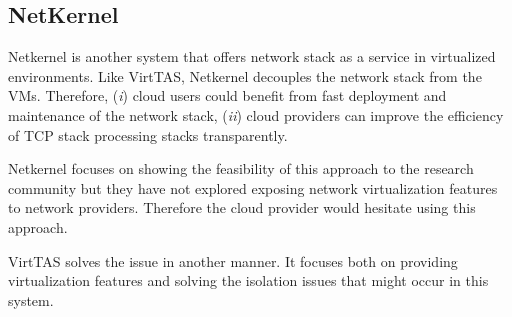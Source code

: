 \subsection{NetKernel}
Netkernel is another system that offers network stack as a service in virtualized 
environments. Like VirtTAS, Netkernel decouples the network stack from the VMs. Therefore, 
(\emph{i}) cloud users could benefit from fast deployment and maintenance of the network 
stack, (\emph{ii}) cloud providers can improve the efficiency of TCP stack processing stacks 
transparently. 

Netkernel focuses on showing the feasibility of this approach to the research community but 
they have not explored exposing network virtualization features to network providers. 
Therefore the cloud provider would hesitate using this approach. %

VirtTAS solves the issue in another manner. It focuses both on providing virtualization 
features and solving the isolation issues that might occur in this system. %